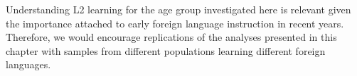 \documentclass[output=paper]{langsci/langscibook}
\begin{document}
Understanding L2 learning for the age group investigated here is relevant given the importance attached to early foreign language instruction in recent years. Therefore, we would encourage replications of the analyses presented in this chapter with samples from different populations learning different foreign languages. 

{\sloppy\printbibliography[heading=subbibliography,notkeyword=this]}
\end{document}
